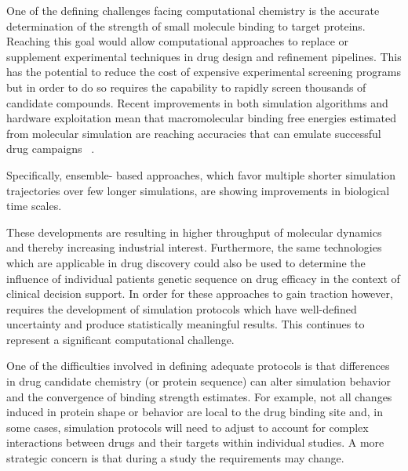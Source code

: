 One of the defining challenges facing computational chemistry is the accurate
determination of the strength of small molecule binding to target proteins.
Reaching this goal would allow computational approaches to replace or
supplement experimental techniques in drug design and refinement pipelines.
This has the potential to reduce the cost of expensive experimental screening
programs but in order to do so requires the capability to rapidly screen
thousands of candidate compounds. Recent improvements in both simulation
algorithms and hardware exploitation mean that macromolecular binding free
energies estimated from molecular simulation are reaching accuracies that can
emulate successful drug campaigns ~\cite{DeVivo2016}.

 Specifically, ensemble-
based approaches, which favor multiple shorter simulation trajectories over
few longer simulations, are showing improvements in biological time scales.


 These developments are resulting in
higher throughput of molecular dynamics and thereby increasing industrial
interest. Furthermore, the same technologies which are applicable in drug
discovery could also be used to determine the influence of individual patients
genetic sequence on drug efficacy in the context of clinical decision support.
In order for these approaches to gain traction however, requires the
development of simulation protocols which have well-defined uncertainty
 and produce statistically meaningful results.
This continues to represent a significant computational challenge. 

One of the difficulties involved in defining adequate protocols is that
differences in drug candidate chemistry (or protein sequence) can alter
simulation behavior and the convergence of binding strength estimates. For
example, not all changes induced in protein shape or behavior are local to the
drug binding site and, in some cases, simulation protocols will need to adjust
to account for complex interactions between drugs and their targets within
individual studies. A more strategic concern is that during a study the
requirements may change. 


